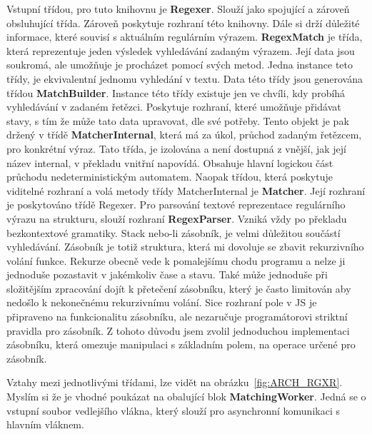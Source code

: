 Vstupní třídou, pro tuto knihovnu je \textbf{Regexer}. 
Slouží jako spojující a zároveň obsluhující třída. 
Zároveň poskytuje rozhraní této knihovny.
Dále si drží důležité informace, které souvisí s aktuálním regulárním výrazem.
\textbf{RegexMatch} je třída, která reprezentuje jeden výsledek vyhledávání zadaným výrazem.
Její data jsou soukromá, ale umožňuje je procházet pomocí svých metod.
Jedna instance teto třídy, je ekvivalentní jednomu vyhledání v textu.
Data této třídy jsou generována třídou \textbf{MatchBuilder}.
Instance této třídy existuje jen ve chvíli, kdy probíhá vyhledávání v zadaném řetězci.
Poskytuje rozhraní, které umožňuje přidávat stavy, s tím že může tato data upravovat, dle své potřeby.
Tento objekt je pak držený v třídě \textbf{MatcherInternal}, 
která má za úkol, průchod zadaným řetězcem, pro konkrétní výraz.
Tato třída, je izolována a není dostupná z vnější, jak její název internal, v překladu vnitřní napovídá.
Obsahuje hlavní logickou část průchodu nedeterministickým automatem.
Naopak třídou, která poskytuje viditelné rozhraní a volá metody třídy MatcherInternal je \textbf{Matcher}.
Její rozhraní je poskytováno třídě Regexer.
Pro parsování textové reprezentace regulárního výrazu na strukturu, slouží rozhraní \textbf{RegexParser}.
Vzniká vždy po překladu bezkontextové gramatiky.
Stack nebo-li zásobník, je velmi důležitou součástí vyhledávání.
Zásobník je totiž struktura, která mi dovoluje se zbavit rekurzivního volání funkce.
Rekurze obecně vede k pomalejšímu chodu programu a nelze ji jednoduše pozastavit v jakémkoliv čase a stavu.
Také může jednoduše při složitějším zpracování dojít k přetečení zásobníku, který je často limitován aby nedošlo k nekonečnému rekurzivnímu volání.
Sice rozhraní pole v JS je připraveno na funkcionalitu zásobníku, ale nezaručuje programátorovi striktní pravidla pro zásobník. 
Z tohoto důvodu jsem zvolil jednoduchou implementaci zásobníku, která omezuje manipulaci s základním polem, na operace určené pro zásobník.

Vztahy mezi jednotlivými třídami, lze vidět na obrázku~\ref{fig:ARCH_RGXR}. 
Myslím si že je vhodné poukázat na obalující blok \textbf{MatchingWorker}.
Jedná se o vstupní soubor vedlejšího vlákna, který slouží pro asynchronní komunikaci s hlavním vláknem.



